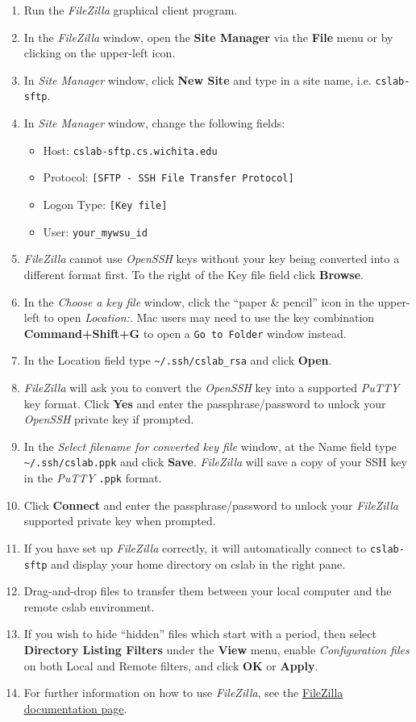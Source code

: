 \documentclass[12pt]{article}
\begin{document}
\begin{flushleft}
\begin{enumerate}
  \item Run the \textit{FileZilla} graphical client program.
  \item In the \textit{FileZilla} window, open the \textbf{Site Manager} via the \textbf{File} menu or by clicking on the upper-left icon.
  \item In \textit{Site Manager} window, click \textbf{New Site} and type in a site name, i.e. \verb|cslab-sftp|.
  \item In \textit{Site Manager} window, change the following fields:
  \begin{itemize}
    \item Host: \verb|cslab-sftp.cs.wichita.edu|
    \item Protocol: \verb|[SFTP - SSH File Transfer Protocol]|
    \item Logon Type: \verb|[Key file]|
    \item User: \verb|your_mywsu_id|
  \end{itemize}
  \item \textit{FileZilla} cannot use \textit{OpenSSH} keys without your key being converted into a different format first. To the right of the Key file field click \textbf{Browse}.
  \item In the \textit{Choose a key file} window, click the ``paper \& pencil'' icon in the upper-left to open \textit{Location:}. Mac users may need to use the key combination \textbf{Command+Shift+G} to open a \texttt{Go to Folder} window instead.
  \item In the Location field type \verb|~/.ssh/cslab_rsa| and click \textbf{Open}.
  \item \textit{FileZilla} will ask you to convert the \textit{OpenSSH} key into a supported \textit{PuTTY} key format. Click \textbf{Yes} and enter the passphrase/password to unlock your \textit{OpenSSH} private key if prompted.
  \item In the \textit{Select filename for converted key file} window, at the Name field type \verb|~/.ssh/cslab.ppk| and click \textbf{Save}. \textit{FileZilla} will save a copy of your SSH key in the \textit{PuTTY} \texttt{.ppk} format. 
  \item Click \textbf{Connect} and enter the passphrase/password to unlock your \textit{FileZilla} supported private key when prompted.
  \item If you have set up \textit{FileZilla} correctly, it will automatically connect to \verb|cslab-sftp| and display your home directory on cslab in the right pane.
  \item Drag-and-drop files to transfer them between your local computer and the remote cslab environment.
  \item If you wish to hide ``hidden'' files which start with a period, then select \textbf{Directory Listing Filters} under the \textbf{View} menu, enable \textit{Configuration files} on both Local and Remote filters, and click \textbf{OK} or \textbf{Apply}.
  \item For further information on how to use \textit{FileZilla}, see the \href{https://wiki.filezilla-project.org/Documentation}{FileZilla documentation page}.
\end{enumerate}


\end{flushleft}
\end{document}
